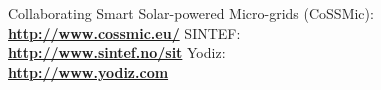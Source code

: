 \begin{thebibliography}{1}

     Collaborating Smart Solar-powered Micro-grids (CoSSMic):\\ \textbf{\url{http://www.cossmic.eu/}}
     SINTEF: \\
        \textbf{ \url{ http://www.sintef.no/sit}}
     Yodiz: \\
        \textbf{ \url{ http://www.yodiz.com}}
\end{thebibliography}
